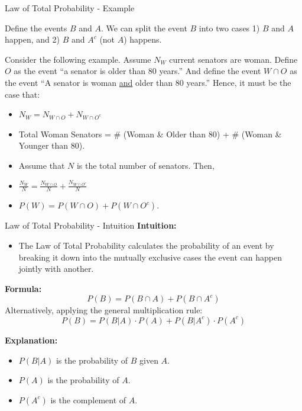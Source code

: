 \documentclass[handout]{beamer} %
\begin{document}
\begin{frame}{Law of Total Probability - Example}

Define the events $B$ and $A$. We can split the event $B$ into two cases 1) $B$ and $A$ happen, and 2) $B$ and $A^c$ (not $A$) happens.  \newline
\vspace{0.5em}


Consider the following example. Assume $N_W$ current senators are woman. Define $O$ as the event ``a senator is older than 80 years.'' And define the event $W \cap O$ as the event ``A senator is woman \underline{and} older than 80 years.'' Hence, it must be the case that:
\begin{itemize}
    \item $N_W = N_{W\cap O} + N_{W\cap O^c}$
    \item Total Woman Senators = \# (Woman \& Older than 80) + \# (Woman \& Younger than 80).
    \item Assume that $N$ is the total number of senators. Then,
    \item $\frac{N_W}{N} = \frac{N_{W\cap O}}{N}+ \frac{N_{W\cap O^c}}{N}$
    \item $P(W) = P(W \cap O) + P(W \cap O^c)$.
\end{itemize}
\end{frame}


\begin{frame}{Law of Total Probability - Intuition}
    \textbf{Intuition:} \pause
    \begin{itemize}
        \item The Law of Total Probability calculates the probability of an event by breaking it down into the mutually exclusive cases the event can happen jointly with another.\pause
    \end{itemize}

    \textbf{Formula:}
    $$  P(B) = P(B \cap A) + P(B\cap A^c)  $$
    Alternatively, applying the general multiplication rule:
    $$ P(B) = P(B|A) \cdot P(A) + P(B|A^c) \cdot P(A^c) $$
    \pause

    \textbf{Explanation:}\pause
    \begin{itemize}
        \item \(P(B|A)\) is the probability of \(B\) given \(A\).\pause
        \item \(P(A)\) is the probability of \(A\).\pause
        \item \(P(A^c)\) is the complement of \(A\).
    \end{itemize}
\end{frame}
\end{document}
